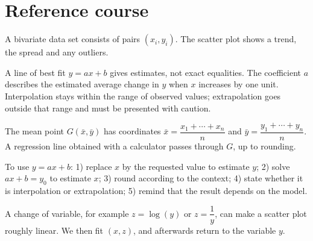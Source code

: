 
\section{Reference course}
A bivariate data set consists of pairs $(x_i,y_i)$. The scatter plot shows a trend, the spread and any outliers.

\begin{center}
\end{center}

\begin{keypoint}
A line of best fit $y=ax+b$ gives estimates, not exact equalities. The coefficient $a$ describes the estimated average change in $y$ when $x$ increases by one unit. Interpolation stays within the range of observed values; extrapolation goes outside that range and must be presented with caution.
\end{keypoint}

The mean point $G(\bar x,\bar y)$ has coordinates $\bar x=\dfrac{x_1+\cdots+x_n}{n}$ and $\bar y=\dfrac{y_1+\cdots+y_n}{n}$. A regression line obtained with a calculator passes through $G$, up to rounding.

\begin{method}
To use $y=ax+b$: 1) replace $x$ by the requested value to estimate $y$; 2) solve $ax+b=y_0$ to estimate $x$; 3) round according to the context; 4) state whether it is interpolation or extrapolation; 5) remind that the result depends on the model.
\end{method}

A change of variable, for example $z=\log(y)$ or $z=\dfrac1y$, can make a scatter plot roughly linear. We then fit $(x,z)$, and afterwards return to the variable $y$.

